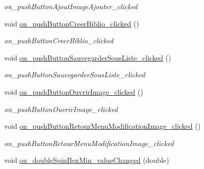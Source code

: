 \begin{DoxyCompactItemize}
\begin{DoxyCompactList}\small\item\em on\+\_\+push\+Button\+Ajout\+Image\+Ajouter\+\_\+clicked \end{DoxyCompactList}\item 
\mbox{\label{classMainWindow_ac70efc539a8c362a65469329f58e0db1}} 
void \hyperlink{classMainWindow_ac70efc539a8c362a65469329f58e0db1}{on\+\_\+push\+Button\+Creer\+Biblio\+\_\+clicked} ()
\begin{DoxyCompactList}\small\item\em on\+\_\+push\+Button\+Creer\+Biblio\+\_\+clicked \end{DoxyCompactList}\item 
\mbox{\label{classMainWindow_a9e4fb81b32de37afdbbddfa67288452a}} 
void \hyperlink{classMainWindow_a9e4fb81b32de37afdbbddfa67288452a}{on\+\_\+push\+Button\+Sauvegarder\+Sous\+Liste\+\_\+clicked} ()
\begin{DoxyCompactList}\small\item\em on\+\_\+push\+Button\+Sauvegarder\+Sous\+Liste\+\_\+clicked \end{DoxyCompactList}\item 
\mbox{\label{classMainWindow_a07a876cbbff67e47d60cbda1316d5b75}} 
void \hyperlink{classMainWindow_a07a876cbbff67e47d60cbda1316d5b75}{on\+\_\+push\+Button\+Ouvrir\+Image\+\_\+clicked} ()
\begin{DoxyCompactList}\small\item\em on\+\_\+push\+Button\+Ouvrir\+Image\+\_\+clicked \end{DoxyCompactList}\item 
\mbox{\label{classMainWindow_ae1ca6c5420cf50c889056f3732b271bf}} 
void \hyperlink{classMainWindow_ae1ca6c5420cf50c889056f3732b271bf}{on\+\_\+push\+Button\+Retour\+Menu\+Modification\+Image\+\_\+clicked} ()
\begin{DoxyCompactList}\small\item\em on\+\_\+push\+Button\+Retour\+Menu\+Modification\+Image\+\_\+clicked \end{DoxyCompactList}\item 
\mbox{\label{classMainWindow_a94b88633fa3b8b6eb9727f973f20a8a1}} 
void \hyperlink{classMainWindow_a94b88633fa3b8b6eb9727f973f20a8a1}{on\+\_\+double\+Spin\+Box\+Min\+\_\+value\+Changed} (double)

\end{DoxyCompactItemize}
